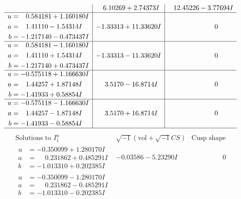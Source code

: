 \documentclass[1p]{elsarticle_modified}
\theoremstyle{definition}
\newcommand{\I}{\sqrt{-1}}
\begin{document}
$$\begin{array}{c|c|c}
 & \phantom{-}6.10269 + 2.74373 I & \phantom{-}12.45226 - 3.77694 I \\ \hline\begin{aligned}
u &= \phantom{-}0.584181 + 1.160180 I \\
a &= \phantom{-}1.41110 - 1.54314 I \\
b &= -1.217140 - 0.473437 I\end{aligned}
 & -1.33313 + 11.33620 I & \phantom{-0.000000 } 0 \\ \hline\begin{aligned}
u &= \phantom{-}0.584181 - 1.160180 I \\
a &= \phantom{-}1.41110 + 1.54314 I \\
b &= -1.217140 + 0.473437 I\end{aligned}
 & -1.33313 - 11.33620 I & \phantom{-0.000000 } 0 \\ \hline\begin{aligned}
u &= -0.575118 + 1.166630 I \\
a &= \phantom{-}1.44257 + 1.87148 I \\
b &= -1.41933 + 0.58854 I\end{aligned}
 & \phantom{-}3.5170 - 16.8714 I & \phantom{-0.000000 } 0 \\ \hline\begin{aligned}
u &= -0.575118 - 1.166630 I \\
a &= \phantom{-}1.44257 - 1.87148 I \\
b &= -1.41933 - 0.58854 I\end{aligned}
 & \phantom{-}3.5170 + 16.8714 I & \phantom{-0.000000 } 0\\
 \hline 
 \end{array}$$\newpage$$\begin{array}{c|c|c}  
\text{Solutions to }I^u_{1}& \I (\text{vol} + \sqrt{-1}CS) & \text{Cusp shape}\\
 \hline 
\begin{aligned}
u &= -0.350099 + 1.280170 I \\
a &= \phantom{-}0.231862 + 0.485291 I \\
b &= -1.013310 + 0.202385 I\end{aligned}
 & -0.03586 - 5.23290 I & \phantom{-0.000000 } 0 \\ \hline\begin{aligned}
u &= -0.350099 - 1.280170 I \\
a &= \phantom{-}0.231862 - 0.485291 I \\
b &= -1.013310 - 0.202385 I\end{aligned}

\end{array}$$
\end{document}
